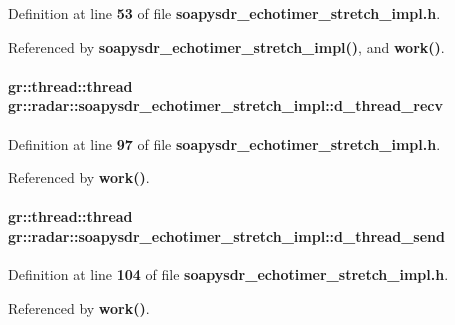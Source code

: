 Definition at line {\bf 53} of file {\bf soapysdr\+\_\+echotimer\+\_\+stretch\+\_\+impl.\+h}.



Referenced by {\bf soapysdr\+\_\+echotimer\+\_\+stretch\+\_\+impl()}, and {\bf work()}.

\paragraph[{d\+\_\+thread\+\_\+recv}]{\setlength{\rightskip}{0pt plus 5cm}gr\+::thread\+::thread gr\+::radar\+::soapysdr\+\_\+echotimer\+\_\+stretch\+\_\+impl\+::d\+\_\+thread\+\_\+recv\hspace{0.3cm}{\ttfamily [private]}}\label{classgr_1_1radar_1_1soapysdr__echotimer__stretch__impl_a6633f1d471c78acb947fd645663817c5}


Definition at line {\bf 97} of file {\bf soapysdr\+\_\+echotimer\+\_\+stretch\+\_\+impl.\+h}.



Referenced by {\bf work()}.

\paragraph[{d\+\_\+thread\+\_\+send}]{\setlength{\rightskip}{0pt plus 5cm}gr\+::thread\+::thread gr\+::radar\+::soapysdr\+\_\+echotimer\+\_\+stretch\+\_\+impl\+::d\+\_\+thread\+\_\+send\hspace{0.3cm}{\ttfamily [private]}}\label{classgr_1_1radar_1_1soapysdr__echotimer__stretch__impl_ae1eb013db58ac857bf2ede857fea5d10}


Definition at line {\bf 104} of file {\bf soapysdr\+\_\+echotimer\+\_\+stretch\+\_\+impl.\+h}.



Referenced by {\bf work()}.

